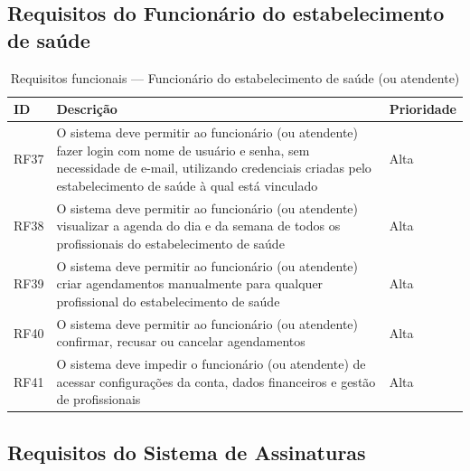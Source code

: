 \subsection{Requisitos do Funcionário do estabelecimento de saúde}
\label{subsec:attendant-requirements}

\begin{table}[H]
  \centering
  \caption{Requisitos funcionais --- Funcionário do estabelecimento de saúde (ou atendente)}
  \label{tab:attendant-requirements}
  \begin{tabular}{p{1.2cm}p{6.5cm}p{2.5cm}}
    \toprule
    \textbf{ID} &
    \textbf{Descrição} &
    \textbf{Prioridade} \\
    \midrule
    RF37 & O sistema deve permitir ao funcionário
           (ou atendente) fazer login com nome de
           usuário e senha, sem necessidade de
           e-mail, utilizando credenciais criadas
           pelo estabelecimento de saúde à qual está vinculado
         & Alta \\
    RF38 & O sistema deve permitir ao funcionário
           (ou atendente) visualizar a agenda do
           dia e da semana de todos os
           profissionais do estabelecimento de saúde
         & Alta \\
    RF39 & O sistema deve permitir ao funcionário
           (ou atendente) criar agendamentos
           manualmente para qualquer profissional
           do estabelecimento de saúde
         & Alta \\
    RF40 & O sistema deve permitir ao funcionário
           (ou atendente) confirmar, recusar ou
           cancelar agendamentos
         & Alta \\
    RF41 & O sistema deve impedir o funcionário
           (ou atendente) de acessar configurações
           da conta, dados financeiros e gestão
           de profissionais
         & Alta \\
    \bottomrule
  \end{tabular}
\end{table}

\subsection{Requisitos do Sistema de Assinaturas}
\label{subsec:subscription-requirements}

